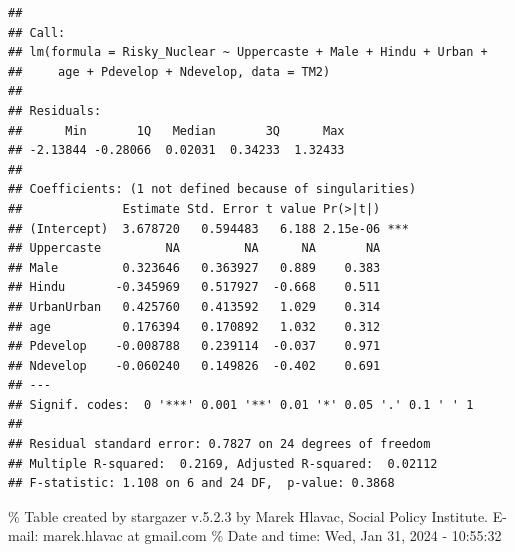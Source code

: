 \documentclass[
]{article}
\begin{document}
\begin{verbatim}
## 
## Call:
## lm(formula = Risky_Nuclear ~ Uppercaste + Male + Hindu + Urban + 
##     age + Pdevelop + Ndevelop, data = TM2)
## 
## Residuals:
##      Min       1Q   Median       3Q      Max 
## -2.13844 -0.28066  0.02031  0.34233  1.32433 
## 
## Coefficients: (1 not defined because of singularities)
##              Estimate Std. Error t value Pr(>|t|)    
## (Intercept)  3.678720   0.594483   6.188 2.15e-06 ***
## Uppercaste         NA         NA      NA       NA    
## Male         0.323646   0.363927   0.889    0.383    
## Hindu       -0.345969   0.517927  -0.668    0.511    
## UrbanUrban   0.425760   0.413592   1.029    0.314    
## age          0.176394   0.170892   1.032    0.312    
## Pdevelop    -0.008788   0.239114  -0.037    0.971    
## Ndevelop    -0.060240   0.149826  -0.402    0.691    
## ---
## Signif. codes:  0 '***' 0.001 '**' 0.01 '*' 0.05 '.' 0.1 ' ' 1
## 
## Residual standard error: 0.7827 on 24 degrees of freedom
## Multiple R-squared:  0.2169, Adjusted R-squared:  0.02112 
## F-statistic: 1.108 on 6 and 24 DF,  p-value: 0.3868
\end{verbatim}

\begingroup\setlength{\tabcolsep}{1pt}

\renewcommand{\arraystretch}{0.7}

\% Table created by stargazer v.5.2.3 by Marek Hlavac, Social Policy
Institute. E-mail: marek.hlavac at gmail.com \% Date and time: Wed, Jan
31, 2024 - 10:55:32
\end{document}
